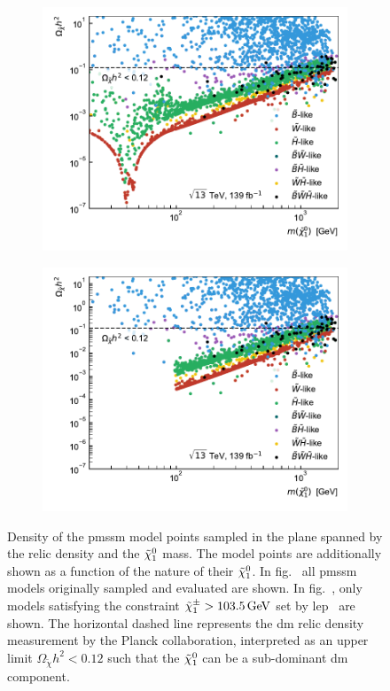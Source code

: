 \begin{figure}[h]
	\centering
	\begin{subfigure}[b]{0.49\linewidth}
		\centering\includegraphics[width=\textwidth]{scatter/relic_density_lsp}
		\caption{\label{fig:relic_density_lsp_no_constraint}}
	\end{subfigure}\hfill
	\begin{subfigure}[b]{0.49\linewidth}
		\centering\includegraphics[width=\textwidth]{scatter/relic_density_lsp_limits}
		\caption{\label{fig:relic_density_lsp_constraint}}
	\end{subfigure}\hfill
	\caption{Density of the \gls{pmssm} model points sampled in the plane spanned by the relic density and the $\tilde{\chi}_1^0$ mass. The model points are additionally shown as a function of the nature of their $\tilde{\chi}_1^0$. In fig.~ all \gls{pmssm} models originally sampled and evaluated are shown. In fig.~, only models satisfying the constraint $\charg > \SI{103.5}{\GeV}$ set by \gls{lep}~\cite{lep_susy_results} are shown. The horizontal dashed line represents the \gls{dm} relic density measurement by the Planck collaboration, interpreted as an upper limit $\Omega_{\tilde{\chi}} h^2 < 0.12$ such that the $\tilde{\chi}_1^0$ can be a sub-dominant \gls{dm} component.}
	\label{fig:relic_density_lsp_withConstraint}
\end{figure}
